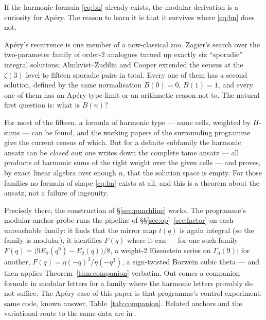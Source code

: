 \documentclass[11pt,reqno]{amsart}
\theoremstyle{plain}
\theoremstyle{definition}
\theoremstyle{remark}
\numberwithin{equation}{section}
\begin{document}
If the harmonic formula \eqref{eq:bn} already exists, the modular derivation is
a curiosity for Ap\'ery. The reason to learn it is that it survives where
\eqref{eq:bn} does not.

Ap\'ery's recurrence is one member of a now-classical zoo. Zagier's search
\cite{Zagier09} over the two-parameter family of order-$2$ analogues turned up
exactly six ``sporadic'' integral solutions; Almkvist--Zudilin
\cite{ASZ} and Cooper \cite{Cooper} extended the census at the $\zeta(3)$ level
to fifteen sporadic pairs in total. Every one of them has a second solution,
defined by the same normalisation $B(0)=0$, $B(1)=1$, and every one of them has
an Ap\'ery-type limit or an arithmetic reason not to. The natural first question
is: what is $B(n)$?

For most of the fifteen, a formula of harmonic type --- same cells, weighted by
$H$-sums --- can be found, and the working papers of the surrounding programme
\cite{RepoSporadics} give the current census of which. But for a definite
subfamily the harmonic ansatz can be \emph{closed out}: one writes down the
complete tame ansatz --- all products of harmonic sums of the right weight over
the given cells --- and proves, by exact linear algebra over enough $n$, that
the solution space is empty. For those families no formula of shape
\eqref{eq:bn} exists at all, and this is a theorem about the ansatz, not a
failure of ingenuity.

Precisely there, the construction of \S\ref{sec:punchline} works. The
programme's modular-anchor probe \cite{RepoAnchors} runs the pipeline of
\S\S\ref{sec:op}--\ref{sec:factor} on each unreachable family: it finds
that the mirror map $t(q)$ is again integral (so the family is modular), it
identifies $F(q)$ where it can --- for one such family
$F(q)=\bigl(9E_2(q^9)-E_2(q)\bigr)/8$, a weight-$2$ Eisenstein series on
$\Gamma_0(9)$; for another, $F(q)=\eta(-q)^3/\eta(-q^3)$, a sign-twisted
Borwein cubic theta --- and then applies Theorem~\ref{thm:companion} verbatim.
Out comes a companion formula in modular letters for a family where the
harmonic letters provably do not suffice. The Ap\'ery case of this paper is
that programme's control experiment: same code, known answer,
Table~\ref{tab:companion}. Related anchors and the variational route to the same
data are in \cite{RepoVar}.
\end{document}
